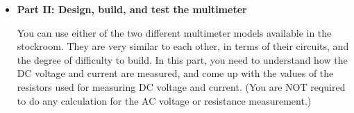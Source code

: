 \begin{itemize}
\begin{enumerate}
\begin{itemize}
%
     
  \end{itemize}

\end{enumerate}


\item {\bf Part II: Design, build, and test the multimeter}

  You can use either of the two different multimeter models available in the 
  stockroom. They are very similar to each other, in terms of their circuits, 
  and the degree of difficulty to build. In this part, you need to understand 
  how the DC voltage and current are measured, and come up with the values of
  the resistors used for measuring DC voltage and current. (You are NOT required
  to do any calculation for the AC voltage or resistance measurement.)


\end{itemize}
